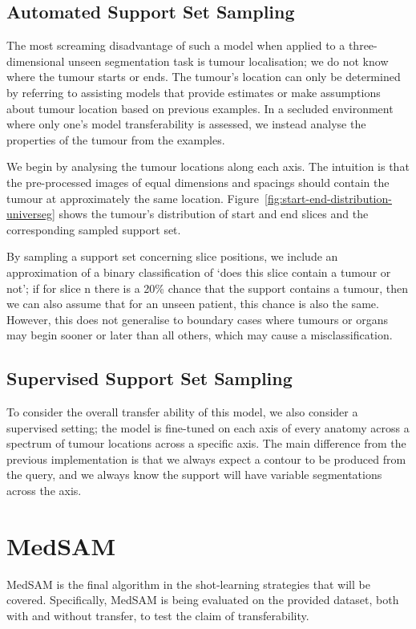 \documentclass[11pt,twoside]{report}
\begin{document}
\subsection{Automated Support Set Sampling}

The most screaming disadvantage of such a model when applied to a three-dimensional unseen segmentation task is tumour localisation; we do not know where the tumour starts or ends. The tumour's location can only be determined by referring to assisting models that provide estimates or make assumptions about tumour location based on previous examples. In a secluded environment where only one's model transferability is assessed, we instead analyse the properties of the tumour from the examples.

We begin by analysing the tumour locations along each axis. The intuition is that the pre-processed images of equal dimensions and spacings should contain the tumour at approximately the same location. Figure~\ref{fig:start-end-distribution-universeg} shows the tumour's distribution of start and end slices and the corresponding sampled support set.

By sampling a support set concerning slice positions, we include an approximation of a binary classification of `does this slice contain a tumour or not'; if for slice n there is a 20\% chance that the support contains a tumour, then we can also assume that for an unseen patient, this chance is also the same. However, this does not generalise to boundary cases where tumours or organs may begin sooner or later than all others, which may cause a misclassification.

\subsection{Supervised Support Set Sampling}

To consider the overall transfer ability of this model, we also consider a supervised setting; the model is fine-tuned on each axis of every anatomy across a spectrum of tumour locations across a specific axis. The main difference from the previous implementation is that we always expect a contour to be produced from the query, and we always know the support will have variable segmentations across the axis.

\section{MedSAM}

MedSAM is the final algorithm in the shot-learning strategies that will be covered. Specifically, MedSAM is being evaluated on the provided dataset, both with and without transfer, to test the claim of transferability.
\end{document}

